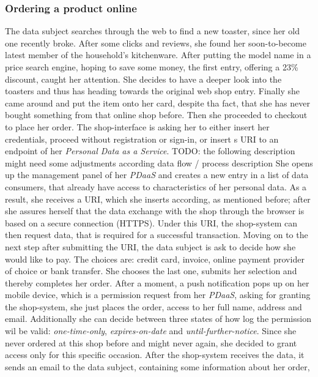 \documentclass[12pt,english,a4paper,titlepage,cleardoublepage=empty,dottedtoc]{report}
\begin{document}
\subsubsection{Ordering a product
online}\label{ordering-a-product-online}

The data subject searches through the web to find a new toaster, since
her old one recently broke. After some clicks and reviews, she found her
soon-to-become latest member of the household's kitchenware. After
putting the model name in a price search engine, hoping to save some
money, the first entry, offering a 23\% discount, caught her attention.
She decides to have a deeper look into the toasters and thus has heading
towards the original web shop entry. Finally she came around and put the
item onto her card, despite tha fact, that she has never bought
something from that online shop before. Then she proceeded to checkout
to place her order. The shop-interface is asking her to either insert
her credentials, proceed without registration or sign-in, or insert s
URI to an endpoint of her \emph{Personal Data as a Service}. TODO: the
following description might need some adjustments according data flow /
process description She opens up the management panel of her
\emph{PDaaS} and creates a new entry in a list of data consumers, that
already have access to characteristics of her personal data. As a
result, she receives a URI, which she inserts according, as mentioned
before; after she assures herself that the data exchange with the shop
through the browser is based on a secure connection (HTTPS). Under this
URI, the shop-system can then request data, that is required for a
successful transaction. Moving on to the next step after submitting the
URI, the data subject is ask to decide how she would like to pay. The
choices are: credit card, invoice, online payment provider of choice or
bank transfer. She chooses the last one, submits her selection and
thereby completes her order. After a moment, a push notification pops up
on her mobile device, which is a permission request from her
\emph{PDaaS}, asking for granting the shop-system, she just places the
order, access to her full name, address and email. Additionally she can
decide between three states of how log the permission wil be valid:
\emph{one-time-only}, \emph{expires-on-date} and
\emph{until-further-notice}. Since she never ordered at this shop before
and might never again, she decided to grant access only for this
specific occasion. After the shop-system receives the data, it sends an
email to the data subject, containing some information about her order,
\end{document}

